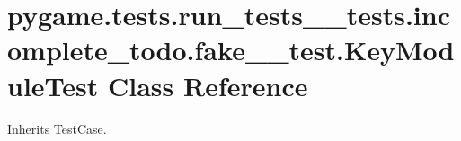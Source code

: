 \hypertarget{classpygame_1_1tests_1_1run__tests____tests_1_1incomplete__todo_1_1fake__2__test_1_1_key_module_test}{}\section{pygame.\+tests.\+run\+\_\+tests\+\_\+\+\_\+tests.\+incomplete\+\_\+todo.\+fake\+\_\+\_\+test.\+Key\+Module\+Test Class Reference}
\label{classpygame_1_1tests_1_1run__tests____tests_1_1incomplete__todo_1_1fake__2__test_1_1_key_module_test}


Inherits Test\+Case.

